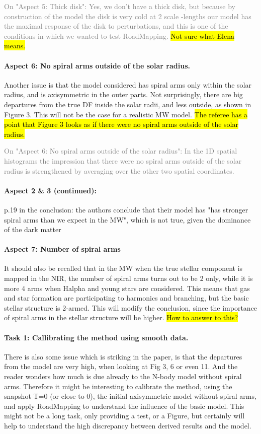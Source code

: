 \documentclass[10pt,a4paper]{article}
\newcommand{\Answer}[1]{\textcolor{Gray}{#1}}
\begin{document}
\Answer{On "Aspect 5: Thick disk": Yes, we don't have a thick 
disk, but because by construction of the model the disk is very cold at 
2 scale -lengths our model has the maximal response of the disk to 
perturbations, and this is one of the conditions in which we wanted to 
test RoadMapping.} \hl{Not sure what Elena means.}

\paragraph{Aspect 6: No spiral arms outside of the solar radius.} Another issue is that the model considered has spiral arms only within the solar
radius, and is axisymmetric in the outer parts. Not surprisingly, there are big
departures from the true DF inside the solar radii, and less outside, as shown in
Figure 3. This will not be the case for a realistic MW model. \hl{The referee has a point that Figure 3 looks as if there were no spiral arms outside of the solar radius.}

\Answer{On "Aspect 6: No spiral arms outside of the solar radius": In the 1D spatial histograms the impression that there were no spiral arms outside of the solar radius is strengthened by averaging over the other two spatial coordinates.}

\paragraph{Aspect 2 \& 3 (continued):} p.19 in the conclusion: the authors conclude that their model has "has stronger spiral arms than we expect in the MW", which is not true, given the dominance of
the dark matter

\paragraph{Aspect 7: Number of spiral arms} It should also be recalled that in the MW when the true stellar component is mapped
in the NIR, the number of spiral arms turns out to be 2 only, while it is more 4
arms when Halpha and young stars are considered. This means that gas and star
formation are participating to harmonics and branching, but the basic stellar
structure is 2-armed. This will modify the conclusion, since the importance of
spiral arms in the stellar structure will be higher. \hl{How to answer to this?}

\paragraph{Task 1: Callibrating the method using smooth data.} There is also some issue which is striking in the paper, is that the departures from
the model are very high, when looking at Fig 3, 6 or even 11. And the reader wonders
how much is due already to the N-body model without spiral arms. Therefore it might
be interesting to calibrate the method, using the snapshot T=0 (or close to 0), the
initial axisymmetric model without spiral arms, and apply RoadMapping to understand
the  influence of the basic model. This might not be a long task, only providing a
test, or a Figure, but certainly will help to understand the high discrepancy
between derived results and the model.
\end{document}
